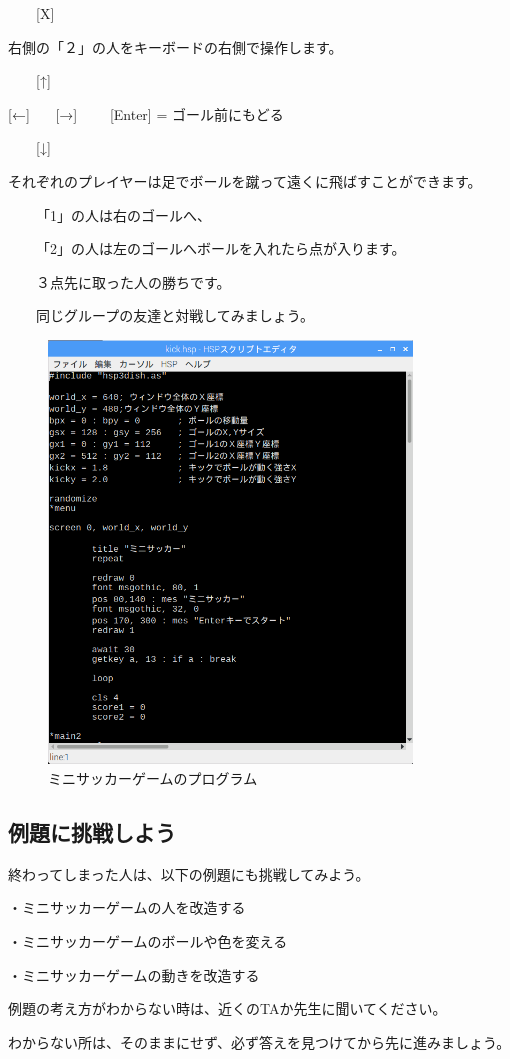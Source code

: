\ \ \ \ [X]



右側の「２」の人をキーボードの右側で操作します。




\ \ \ \ [↑]

[←] \ \ \ [→] \ \ \ \ [Enter] = ゴール前にもどる

\ \ \ \ [↓]




それぞれのプレイヤーは足でボールを蹴って遠くに飛ばすことができます。

\ \ \ \ 「1」の人は右のゴールへ、

\ \ \ \ 「2」の人は左のゴールへボールを入れたら点が入ります。


\ \ \ \ ３点先に取った人の勝ちです。

\ \ \ \ 同じグループの友達と対戦してみましょう。



\begin{figure}[H]
    \begin{center}
      \includegraphics[keepaspectratio,width=9.657cm,height=11.229cm]{text04-img/text04-img006.png}
      \caption{ミニサッカーゲームのプログラム}
    \end{center}
    \label{fig:prog_menu}
\end{figure}


\newpage
\subsection{例題に挑戦しよう}

終わってしまった人は、以下の例題にも挑戦してみよう。


・ミニサッカーゲームの人を改造する

・ミニサッカーゲームのボールや色を変える

・ミニサッカーゲームの動きを改造する



例題の考え方がわからない時は、近くのTAか先生に聞いてください。

わからない所は、そのままにせず、必ず答えを見つけてから先に進みましょう。


